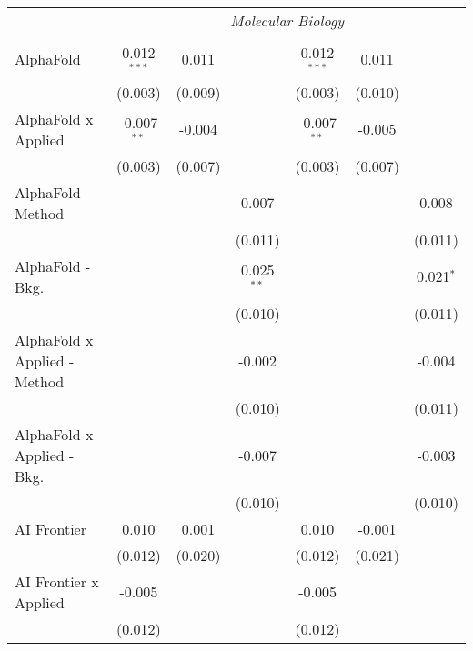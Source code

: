 \begin{tabular}{lcccccc}
 & \multicolumn{6}{c}{\textit{Molecular Biology}} \\ \\
   AlphaFold                    & 0.012$^{***}$ & 0.011       &                & 0.012$^{***}$ & 0.011   &   \\   
                                & (0.003)       & (0.009)     &                & (0.003)       & (0.010) &   \\   
   AlphaFold x Applied          & -0.007$^{**}$ & -0.004      &                & -0.007$^{**}$ & -0.005  &   \\   
                                & (0.003)       & (0.007)     &                & (0.003)       & (0.007) &   \\   
   AlphaFold - Method           &               &             & 0.007          &               &         & 0.008\\   
                                &               &             & (0.011)        &               &         & (0.011)\\   
   AlphaFold - Bkg.             &               &             & 0.025$^{**}$   &               &         & 0.021$^{*}$\\   
                                &               &             & (0.010)        &               &         & (0.011)\\   
   AlphaFold x Applied - Method &               &             & -0.002         &               &         & -0.004\\   
                                &               &             & (0.010)        &               &         & (0.011)\\   
   AlphaFold x Applied - Bkg.   &               &             & -0.007         &               &         & -0.003\\   
                                &               &             & (0.010)        &               &         & (0.010)\\   
   AI Frontier                  & 0.010         & 0.001       &                & 0.010         & -0.001  &   \\   
                                & (0.012)       & (0.020)     &                & (0.012)       & (0.021) &   \\   
   AI Frontier x Applied        & -0.005        &             &                & -0.005        &         &   \\   
                                & (0.012)       &             &                & (0.012)       &         &   \\   

\end{tabular}
